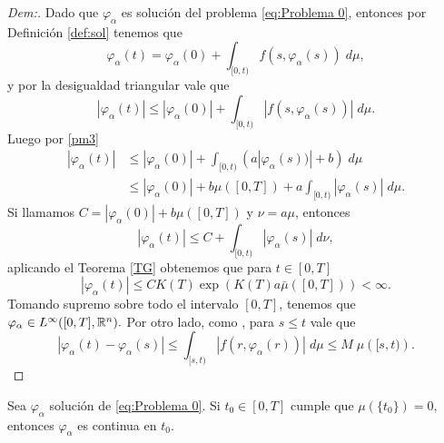 \begin{proof}[Dem:]
 	Dado que $\varphi_{\alpha}$ es solución del problema \eqref{eq:Problema 0}, entonces por Definición  \ref{def:sol} tenemos que
 		$$\varphi_{\alpha}(t)=\varphi_{\alpha}(0)+\int_{[0,t)} f(s,\varphi_{\alpha}(s))\;d\mu,$$
 y por la desigualdad triangular vale que 
$$ 		|\varphi_{\alpha}(t)| \leq |\varphi_{\alpha}(0)|+\int_{[0,t)}| f(s,\varphi_{\alpha}(s))|\;d\mu.$$
Luego por \ref{pm3}
\begin{equation*}
\begin{split}
 	|\varphi_{\alpha}(t)| &\leq  |\varphi_{\alpha}(0)|+\int_{[0,t)}\left(a|\varphi_{\alpha}(s))|+b\right)\;d\mu\\	
     &\leq |\varphi_{\alpha}(0)|+b\mu([0,T])+a\int_{[0,t)}| \varphi_{\alpha}(s)|\;d\mu.
\end{split}
\end{equation*}
 Si llamamos $C=|\varphi_{\alpha}(0)|+b\mu([0,T])$ y $\nu=a\mu$, entonces
 $$|\varphi_{\alpha}(t)| \leq C+\int_{[0,t)}| \varphi_{\alpha}(s)|\;d\nu,$$
 aplicando el Teorema \ref{TG} obtenemos que para $t\in[0,T]$
 \begin{equation*}
 	|\varphi_{\alpha}(t)|\leq CK(T)\exp\left(K(T)a\bar{\mu}([0,T]) \right)  < \infty.
 \end{equation*}
Tomando supremo sobre todo el intervalo $[0,T]$, tenemos que\\
$\varphi_{\alpha}\in L^\infty([0,T],\mathbb{R}^n).$
Por otro lado, como , para $s\leq t$ vale que
  	\begin{equation*}
  		|\varphi_\alpha(t)-\varphi_\alpha(s)|\leq \int_{[s,t)}|f(r,\varphi_\alpha(r))|\;d\mu\leq M\;\mu\left( [s,t) \right). 
  	\end{equation*}
  
\end{proof}
\begin{cor}\label{corolario_continuidad}
    Sea $\varphi_\alpha$ solución de  \eqref{eq:Problema 0}. Si $t_0\in [0,T]$ cumple que $\mu(\{t_0\})=0$,  entonces $\varphi_\alpha$ es continua en $t_0$.
\end{cor}

